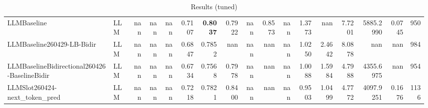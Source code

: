 \begin{table}[htbp]
{\begin{tabular}{ll|rrrrrrrrrrrrrr|r}
LLMBaseline & LLM & nan & nan & nan & 0.7107 & \textbf{0.8037} & 0.7922 & nan & 0.8573 & nan & 1.3773 & nan & 7.7201 & 5885.2990 & 0.0745 & 950 \\
LLMBaseline260429-LB-Bidir & LLM & nan & nan & nan & 0.6847 & 0.7852 & nan & nan & nan & nan & 1.0250 & 2.4642 & 8.0878 & nan & nan & 984 \\
LLMBaselineBidirectional260426-BaselineBidir & LLM & nan & nan & nan & 0.6734 & 0.7568 & 0.7978 & nan & nan & nan & 1.0088 & 1.5984 & 4.7988 & 4355.6975 & nan & 954 \\
LLMSlot260424-next\_token\_pred & LLM & nan & nan & nan & 0.7218 & 0.7821 & 0.8400 & nan & nan & nan & 0.9503 & 1.0499 & 4.7772 & 4097.9251 & 0.1676 & 1136 \\
\bottomrule
\end{tabular}
}
\caption{Results (tuned)}
\label{tab:results_tuned}
\end{table}